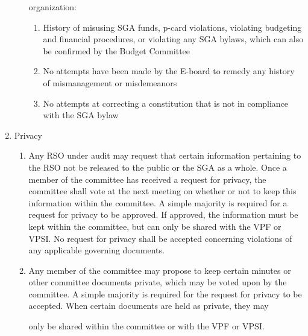 \documentclass[12pt]{scrreprt}
\begin{document}
\begin{enumerate}
\begin{enumerate}
organization:
\begin{enumerate}
    \item History of misusing SGA funds, p-card violations,
violating budgeting and financial procedures, or violating any SGA
bylaws, which can also be confirmed by the Budget Committee
\item No attempts have been made by the E-board to remedy any
history of mismanagement or misdemeanors
\item No attempts at correcting a constitution that is not in compliance with the SGA bylaw
\end{enumerate}
\end{enumerate}
\item Privacy
\begin{enumerate}
    \item Any RSO under audit may request that certain information pertaining to
the RSO
not be released to the public or the SGA as a whole. Once a member of the
committee has received a request for privacy, the committee shall vote at the
next meeting on whether or not to keep this information within the committee.
A simple majority is required for a request for privacy to be approved. If
approved, the information must be kept within the committee, but can only be
shared with the VPF or VPSI. No request for privacy shall be accepted
concerning violations of any applicable governing documents.
\item Any
member of the committee may propose to keep certain minutes or other
committee documents private, which may be voted upon by the
committee. A simple majority is required for the request for privacy to
be accepted. When certain documents are held as private, they may

only be shared within the committee or with the VPF or VPSI.
\end{enumerate}
\end{enumerate}
\end{document}

